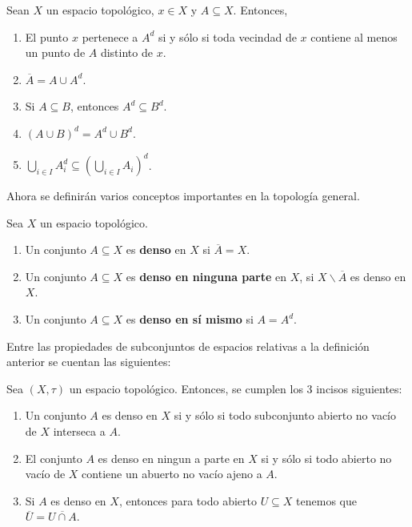 \documentclass[12pt]{report}
\theoremstyle{largebreak}
\renewcommand{\theenumi}{\arabic{enumi})}
\begin{document}
    \begin{propo}
        Sean $X$ un espacio topológico, $x\in X$ y $A\subseteq X$. Entonces,
        \renewcommand{\theenumi}{D\arabic{enumi})}
        \begin{enumerate}
            \item El punto $x$ pertenece a $A^d$ si y sólo si toda vecindad de $x$ contiene al menos un punto de $A$ distinto de $x$.
            \item $\overline{A}=A\cup A^d$.
            \item Si $A\subseteq B$, entonces $A^d\subseteq B^d$.
            \item $(A\cup B)^d=A^d\cup B^d$.
            \item $\bigcup_{i\in I} A_i^d\subseteq \left(\bigcup_{i\in I}A_i\right)^d$.
        \end{enumerate}
    \end{propo}

    Ahora se definirán varios conceptos importantes en la topología general.

    \begin{mydef}
        Sea $X$ un espacio topológico.
        \renewcommand{\theenumi}{\arabic{enumi})}
        \begin{enumerate}
            \item Un conjunto $A\subseteq X$ es \textbf{denso} en $X$ si $\overline{A}=X$.
            \item Un conjunto $A\subseteq X$ es \textbf{denso en ninguna parte} en $X$, si $X\backslash \overline{A}$ es denso en $X$.
            \item Un conjunto $A\subseteq X$ es \textbf{denso en sí mismo} si $A=A^d$.
        \end{enumerate}
    \end{mydef}

    Entre las propiedades de subconjuntos de espacios relativas a la definición anterior se cuentan las siguientes:

    \begin{propo}
        Sea $(X,\tau)$ un espacio topológico. Entonces, se cumplen los 3 incisos siguientes:
        \begin{enumerate}
            \item Un conjunto $A$ es denso en $X$ si y sólo si todo subconjunto abierto no vacío de $X$ interseca a $A$.
            \item El conjunto $A$ es denso en ningun a parte en $X$ si y sólo si todo abierto no vacío de $X$ contiene un abuerto no vacío ajeno a $A$.
            \item Si $A$ es denso en $X$, entonces para todo abierto $U\subseteq X$ tenemos que $\overline{U}=\overline{U\cap A}$.
        \end{enumerate}
    \end{propo}
\end{document}
